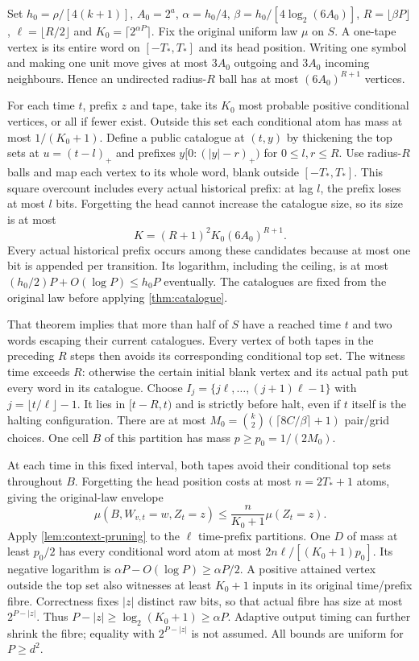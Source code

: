\begin{informalproof}
Set $h_0=\rho/[4(k+1)]$, $A_0=2^a$,
$\alpha=h_0/4$, $\beta=h_0/[4\log_2(6A_0)]$,
$R=\lfloor\beta P\rfloor$, $\ell=\lfloor R/2\rfloor$ and
$K_0=\lceil2^{\alpha P}\rceil$. Fix the original uniform law $\mu$ on $S$.
A one-tape vertex is its entire word on $[-T_*,T_*]$ and its head position.
Writing one symbol and making one unit move gives at most $3A_0$ outgoing
and $3A_0$ incoming neighbours. Hence an undirected radius-$R$ ball has
at most $(6A_0)^{R+1}$ vertices.

For each time $t$, prefix $z$ and tape, take its $K_0$ most probable positive
conditional vertices, or all if fewer exist. Outside this set each conditional
atom has mass at most $1/(K_0+1)$. Define a public catalogue at $(t,y)$ by thickening the top sets at
$u=(t-l)_+$ and prefixes $y[0:(|y|-r)_+)$ for $0\le l,r\le R$.
Use radius-$R$ balls and map each vertex to its whole word, blank outside
$[-T_*,T_*]$. This square overcount includes every actual historical
prefix: at lag $l$, the prefix loses at most $l$ bits. Forgetting the head
cannot increase the catalogue size, so its size is at most
\[
 K=(R+1)^2K_0(6A_0)^{R+1}.
\]
Every actual historical prefix occurs among these candidates because at most
one bit is appended per transition. Its logarithm, including the ceiling,
is at most $(h_0/2)P+O(\log P)\le h_0P$ eventually. The catalogues are
fixed from the original law before applying \cref{thm:catalogue}.

That theorem implies that more than half of $S$ have a reached time $t$ and
two words escaping their current catalogues. Every vertex of both tapes in
the preceding $R$ steps then avoids its corresponding conditional top set.
The witness time exceeds $R$: otherwise the certain initial blank vertex
and its actual path put every word in its catalogue. Choose
$I_j=\{j\ell,\ldots,(j+1)\ell-1\}$ with $j=\lfloor t/\ell\rfloor-1$.
It lies in $[t-R,t)$ and is strictly before halt, even if $t$ itself is the
halting configuration. There are at most
$M_0=\binom k2(\lceil8C/\beta\rceil+1)$ pair/grid choices. One cell $B$
of this partition has mass $p\ge p_0=1/(2M_0)$.

At each time in this fixed interval, both tapes avoid their conditional top
sets throughout $B$. Forgetting the head position costs at most
$n=2T_*+1$ atoms, giving the original-law envelope
\[
 \mu(B,W_{v,t}=w,Z_t=z)\le \frac{n}{K_0+1}\mu(Z_t=z).
\]
Apply \cref{lem:context-pruning} to the $\ell$ time-prefix partitions. One
$D$ of mass at least $p_0/2$ has every conditional word atom at most
$2n\ell/[(K_0+1)p_0]$. Its negative logarithm is
$\alpha P-O(\log P)\ge\alpha P/2$. A positive attained vertex outside
the top set also witnesses at least $K_0+1$ inputs in its original
time/prefix fibre. Correctness fixes $|z|$ distinct raw bits, so that actual
fibre has size at most $2^{P-|z|}$. Thus $P-|z|\ge\log_2(K_0+1)\ge\alpha P$.
Adaptive output timing can further shrink the fibre; equality with
$2^{P-|z|}$ is not assumed. All bounds are uniform for $P\ge d^2$.


\end{informalproof}
